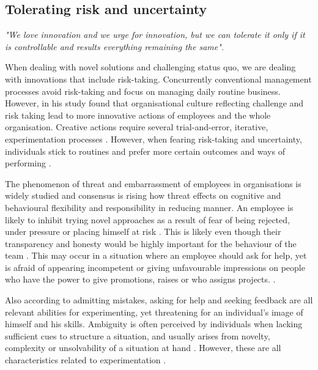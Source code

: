 \subsection{Tolerating risk and uncertainty}
\textit{"We love innovation and we urge for innovation, but we can tolerate it only if it is controllable and results everything remaining the same".} \citep{quinn1985managing}
\newline

When dealing with novel solutions and challenging status quo, we are dealing with innovations that include risk-taking. Concurrently conventional management processes avoid risk-taking and focus on managing daily routine business. \citep{quinn1985managing} However, in his study \citet{nystrom1990organizational} found that organisational culture reflecting challenge and risk taking lead to more innovative actions of employees and the whole organisation. Creative actions require several trial-and-error, iterative, experimentation processes \citep{shalley2004leaders}. 
However, when fearing risk-taking and uncertainty, individuals stick to routines and prefer more certain outcomes and ways of performing  \citep{bazerman2012judgment,shalley2004leaders}. 

The phenomenon of threat and embarrassment of employees in organisations is widely studied and consensus is rising how threat effects on cognitive and behavioural flexibility and responsibility in reducing manner. \citep{argyris1982reasoning,edmondson1999psychological,staw1989tradeoff} An employee is likely to inhibit trying novel approaches as a result of fear of being rejected, under pressure or placing himself at risk \citep{edmondson1999psychological}. This is likely even though their transparency and honesty would be highly important for the behaviour of the team \citep{argyris1982reasoning, edmondson1999psychological}. This may occur in a situation where an employee should ask for help, yet is afraid of appearing incompetent or giving unfavourable impressions on people who have the power to give promotions, raises or who assigns projects. \citep{edmondson1999psychological,brown1990politeness}. 

Also according to \citet{brown1990politeness} admitting mistakes, asking for help and seeking feedback are all relevant abilities for experimenting, yet threatening for an individual's image of himself and his skills. Ambiguity is often perceived by individuals when lacking sufficient cues to structure a situation, and usually arises from novelty, complexity or unsolvability of a situation at hand \citep{budner1962intolerance}. However, these are all characteristics related to experimentation \citep{tuulenmaki2011art}. 

